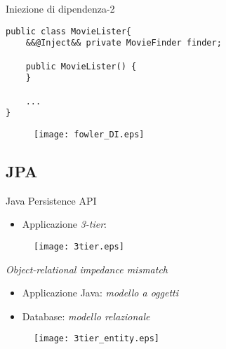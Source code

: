\begin{frame}[fragile]{Iniezione di dipendenza-2}


\begin{lstlisting}[basicstyle={\tiny\ttfamily}]
public class MovieLister{
    &&@Inject&& private MovieFinder finder;
    
    public MovieLister() {
    }
    
    ...
}
\end{lstlisting}


\begin{figure}
	\centering
	\texttt{[image: fowler\_DI.eps]}
\end{figure}


\end{frame}




\subsection{JPA}
\begin{frame}{Java Persistence API}

\begin{itemize}
\item Applicazione \textsl{3-tier}:
\end{itemize}

\begin{figure}
	\centering
	\texttt{[image: 3tier.eps]}
\end{figure}

\end{frame}


\begin{frame}{\textsl{Object-relational impedance mismatch}}


\begin{itemize}

\vspace{0.4em}

\item Applicazione Java: \textsl{modello a oggetti}

\vspace{0.7em}

\item Database: \textsl{modello relazionale}

\end{itemize}

\begin{figure}
	\centering
	\texttt{[image: 3tier\_entity.eps]}
\end{figure}

\end{frame}





